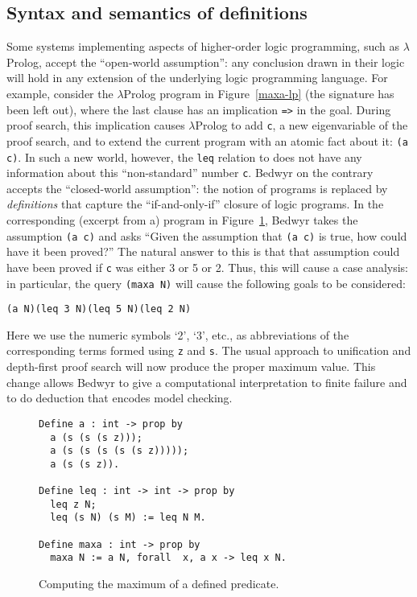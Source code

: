 \documentclass{article}
\newcommand{\lp}{$\lambda$Prolog}
\begin{document}
\subsection{Syntax and semantics of definitions}

Some systems implementing aspects of higher-order logic programming,
such as \lp{}, accept the ``open-world assumption'': any conclusion
drawn in their logic will hold in any extension of the underlying logic
programming language.
For example, consider the \lp{} program in Figure~\ref{maxa-lp} (the
signature has been left out), where the last clause has an implication
\verb.=>. in the goal. During proof search, this implication
causes \lp{} to add \verb.c., a new eigenvariable of the proof search,
and to extend the current program with an atomic fact about it:
\verb.(a c).. In such a new world, however, the {\tt leq} relation to
does not have any information about this ``non-standard'' number
{\tt c}.
Bedwyr on the contrary accepts the ``closed-world assumption'': the
notion of programs is replaced by {\em definitions} that capture the
``if-and-only-if'' closure of logic programs. In the corresponding
(excerpt from a) program in Figure~\ref{maxa-bdw}, Bedwyr takes the
assumption \verb.(a c). and asks ``Given the assumption that
\verb.(a c). is true, how could have it been proved?'' The natural
answer to this is that that assumption could have been proved if
\verb.c. was either 3 or 5 or 2. Thus, this will cause a case analysis:
in particular, the query \verb.(maxa N). will cause the following goals
to be considered:
\begin{center}
  \tt(a N)\qquad(leq 3 N)\qquad(leq 5 N)\qquad(leq 2 N)
\end{center}
Here we use the numeric symbols `2', `3', etc., as abbreviations of the
corresponding terms formed using \texttt{z} and \texttt{s}. The usual
approach to unification and depth-first proof search will now produce
the proper maximum value. This change allows Bedwyr to give a
computational interpretation to finite failure and to do deduction that
encodes model checking.

\begin{figure}
\begin{verbatim}
Define a : int -> prop by
  a (s (s (s z)));
  a (s (s (s (s (s z)))));
  a (s (s z)).

Define leq : int -> int -> prop by
  leq z N;
  leq (s N) (s M) := leq N M.

Define maxa : int -> prop by
  maxa N := a N, forall  x, a x -> leq x N.
\end{verbatim}
\caption{Computing the maximum of a defined predicate.}
\label{maxa-bdw}
\end{figure}
\end{document}
